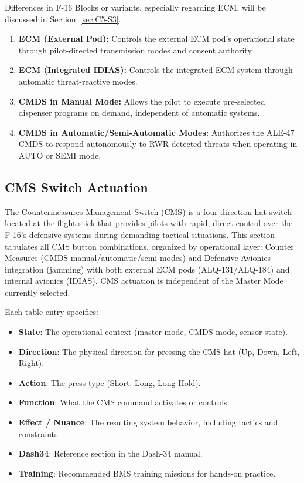 \documentclass[11pt,a4paper]{article}
\begin{document}
Differences in F-16 Blocks or variants, especially regarding ECM, will be discussed in Section~\ref{sec:C5-S3}.

\begin{enumerate}
  \item \textbf{ECM (External Pod):} Controls the external ECM pod's operational state through pilot-directed transmission modes and consent authority.
  \item \textbf{ECM (Integrated IDIAS):} Controls the integrated ECM system through automatic threat-reactive modes.
  \item \textbf{CMDS in Manual Mode:} Allows the pilot to execute pre-selected dispenser programs on demand, independent of automatic systems.
  \item \textbf{CMDS in Automatic/Semi-Automatic Modes:} Authorizes the ALE-47 CMDS to respond autonomously to RWR-detected threats when operating in AUTO or SEMI mode.
\end{enumerate}

\subsection{CMS Switch Actuation}\label{sec:C5-S2}

The Countermeasures Management Switch (CMS) is a four-direction hat switch located at the flight stick that provides pilots with rapid, direct control over the F-16's defensive systems during demanding tactical situations. This section tabulates all CMS button combinations, organized by operational layer: Counter Measures (CMDS manual/automatic/semi modes) and Defensive Avionics integration (jamming) with both external ECM pods (ALQ-131/ALQ-184) and internal avionics (IDIAS). CMS actuation is independent of the Master Mode currently selected.

Each table entry specifies:

\begin{itemize}
  \item \textbf{State}: The operational context (master mode, CMDS mode, sensor state).
  \item \textbf{Direction}: The physical direction for pressing the CMS hat (Up, Down, Left, Right).
  \item \textbf{Action}: The press type (Short, Long, Long Hold).
  \item \textbf{Function}: What the CMS command activates or controls.
  \item \textbf{Effect / Nuance}: The resulting system behavior, including tactics and constraints.
  \item \textbf{Dash34}: Reference section in the Dash-34 manual.
  \item \textbf{Training}: Recommended BMS training missions for hands-on practice.
\end{itemize}
\end{document}
